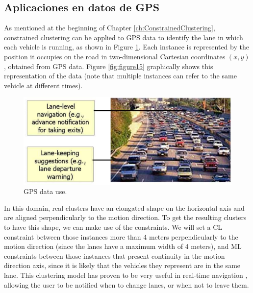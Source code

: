 \subsection{Aplicaciones en datos de GPS} \label{sec:GPSApp}

As mentioned at the beginning of Chapter \ref{ch:ConstrainedClustering}, constrained clustering can be applied to \acs{GPS} data to identify the lane in which each vehicle is running, as shown in Figure \ref{fig:GPSClustData}. Each instance is represented by the position it occupies on the road in two-dimensional Cartesian coordinates $(x,y)$, obtained from \acs{GPS} data. Figure \ref{fig:figure15} graphically shows this representation of the data (note that multiple instances can refer to the same vehicle at different times).

\begin{figure}[!h]
	\centering
	\includegraphics[scale=0.3]{gfx/ConstClust/GPS/Coches} 
	\caption[GPS data use.]{GPS data use. \cite{davidson2007survey} \cite{wagstaff2001constrained}}\label{fig:GPSClustData}
\end{figure}


In this domain, real clusters have an elongated shape on the horizontal axis and are aligned perpendicularly to the motion direction. To get the resulting clusters to have this shape, we can make use of the constraints. We will set a \acf{CL} constraint between those instances more than 4 meters perpendicularly to the motion direction (since the lanes have a maximum width of 4 meters), and \acf{ML} constraints between those instances that present continuity in the motion direction axis, since it is likely that the vehicles they represent are in the same lane. This clustering model has proven to be very useful in real-time navigation \cite{wagstaff2001constrained}, allowing the user to be notified when to change lanes, or when not to leave them.

